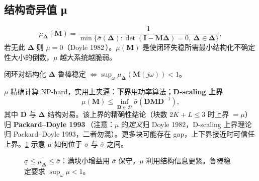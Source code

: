 \subsection{结构奇异值 μ}
\begin{definition}[结构奇异值]
\label{def:mu}
\begin{equation}
  \mu_{\boldsymbol\Delta}(\mathbf M)=\frac{1}{\min\{\bar\sigma(\boldsymbol\Delta):\det(\mathbf I-\mathbf M\boldsymbol\Delta)=0,\ \boldsymbol\Delta\in\boldsymbol\Delta\}},
\end{equation}
若无此 $\boldsymbol\Delta$ 则 $\mu=0$（Doyle 1982\,\cite{doyle1982mu}）。$\mu(\mathbf M)$ 是使闭环失稳所需最小结构化不确定性大小的倒数，$\mu$ 越大系统越脆弱。
\end{definition}

\begin{theorem}[μ 鲁棒稳定判据]
\label{thm:mu-rs}
闭环对结构化 $\boldsymbol\Delta$ 鲁棒稳定 $\iff \sup_\omega\mu_{\boldsymbol\Delta}(\mathbf M(j\omega))<1$。
\end{theorem}

$\mu$ 精确计算 NP-hard，实用上夹逼：\textbf{下界}用功率算法；\textbf{D-scaling 上界}
\begin{equation}
  \mu(\mathbf M)\le\inf_{\mathbf D\in\mathcal D}\bar\sigma(\mathbf D\mathbf M\mathbf D^{-1}),
  \label{eq:d-scaling}
\end{equation}
其中 $\mathbf D$ 与 $\boldsymbol\Delta$ 结构对易。该上界的精确性结论（块数 $2K+L\le3$ 时上界 $=\mu$）归 \textbf{Packard--Doyle 1993}\,\cite{packard1993mu}（注意：$\mu$ 的\emph{定义}归 Doyle 1982，D-scaling 上界理论归 Packard--Doyle 1993，二者勿混）。更多块可能存在 gap，上下界接近时可信任上界。\cref{fig:mu-vs-sigma} 示意 $\mu$ 如何位于 $\underline\sigma$ 与 $\bar\sigma$ 之间。

\begin{figure}[ht]
\centering
{}
\caption{$\underline\sigma\le\mu_{\boldsymbol\Delta}\le\bar\sigma$：满块小增益用 $\bar\sigma$ 保守，$\mu$ 利用结构信息更紧。鲁棒稳定要求 $\sup_\omega\mu<1$。}
\label{fig:mu-vs-sigma}
\end{figure}

